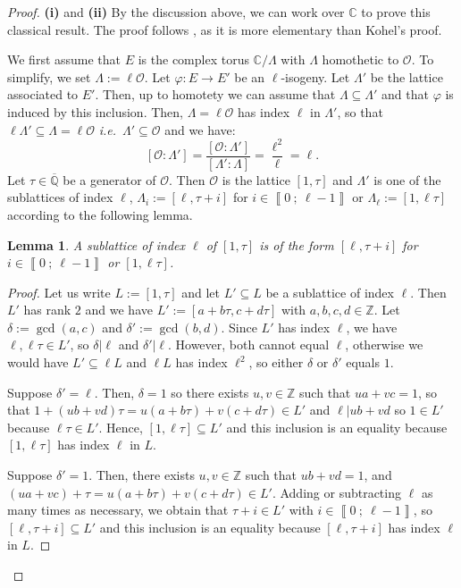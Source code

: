 \documentclass[a4paper,10pt]{report}
\theoremstyle{definition}
\theoremstyle{plain}
\newtheorem{Lemma}[Definition]{Lemma}
\theoremstyle{definition}
\newcommand{\ie}{\emph{i.e.}\ }
\newcommand{\Z}{\mathbb{Z}}
\newcommand{\Q}{\mathbb{Q}}
\newcommand{\C}{\mathbb{C}}
\newcommand{\mO}{\mathcal{O}}
\renewcommand{\i}[2]{\left\llbracket #1~;~#2\right\rrbracket}
\renewcommand{\(}{\left(}
\renewcommand{\)}{\right)}
\begin{document}
\begin{proof}
\textbf{(i)} and \textbf{(ii)} By the discussion above, we can work over $\C$ to prove this classical result. The proof follows \cite[Theorem 23.5]{MIT}, as it is more elementary than Kohel's proof. 

We first assume that $E$ is the complex torus $\C/\Lambda$ with $\Lambda$ homothetic to $\mO$. To simplify, we set $\Lambda:=\ell\mO$. Let $\varphi: E\longrightarrow E'$ be an $\ell$-isogeny.  Let $\Lambda'$ be the lattice associated to $E'$. Then, up to homotety we can assume that $\Lambda\subseteq \Lambda'$ and that $\varphi$ is induced by this inclusion. Then, $\Lambda=\ell\mO$ has index $\ell$ in $\Lambda'$, so that $\ell\Lambda'\subseteq\Lambda=\ell\mO$ \ie $\Lambda'\subseteq\mO$ and we have: 
\[[\mO:\Lambda']=\frac{[\mO:\Lambda']}{[\Lambda':\Lambda]}=\frac{\ell^2}{\ell}=\ell.\]
Let $\tau\in\overline{\Q}$ be a generator of $\mO$. Then $\mO$ is the lattice $[1,\tau]$ and $\Lambda'$ is one of the sublattices of index $\ell$, $\Lambda_i:=[\ell,\tau+i]$ for $i\in\i{0}{\ell-1}$ or $\Lambda_\ell:=[1,\ell\tau]$ according to the following lemma.

\begin{Lemma}
A sublattice of index $\ell$ of $[1,\tau]$ is of the form $[\ell,\tau+i]$ for $i\in\i{0}{\ell-1}$ or $[1,\ell\tau]$.
\end{Lemma}

\begin{proof}
Let us write $L:=[1,\tau]$ and let $L'\subseteq L$ be a sublattice of index $\ell$. Then $L'$ has rank $2$ and we have $L':=[a+b\tau,c+d\tau]$ with $a,b,c,d\in\Z$.  Let $\delta:=\gcd(a,c)$ and $\delta':=\gcd(b,d)$. Since $L'$ has index $\ell$, we have $\ell,\ell\tau\in L'$, so $\delta|\ell$ and $\delta'|\ell$. However, both cannot equal $\ell$, otherwise we would have $L'\subseteq\ell L$ and $\ell L$ has index $\ell^2$, so either $\delta$ or $\delta'$ equals $1$.  

Suppose $\delta'=\ell$.  Then, $\delta=1$ so there exists $u, v\in\Z$ such that $ua+vc=1$, so that $1+(ub+vd)\tau=u(a+b\tau)+v(c+d\tau)\in L'$ and $\ell|ub+vd$ so $1\in L'$ because $\ell\tau\in L'$. Hence, $[1,\ell\tau]\subseteq L'$ and this inclusion is an equality because $[1,\ell\tau]$ has index $\ell$ in $L$. 

Suppose $\delta'=1$.  Then, there exists $u, v\in\Z$ such that $ub+vd=1$, and $(ua+vc)+\tau=u(a+b\tau)+v(c+d\tau)\in L'$. Adding or subtracting $\ell$ as many times as necessary, we obtain that $\tau+i\in L'$ with $i\in\i{0}{\ell-1}$, so $[\ell,\tau+i]\subseteq L'$ and this inclusion is an equality because $[\ell,\tau+i]$ has index $\ell$ in $L$. 
\end{proof}


\end{proof}
\end{document}
